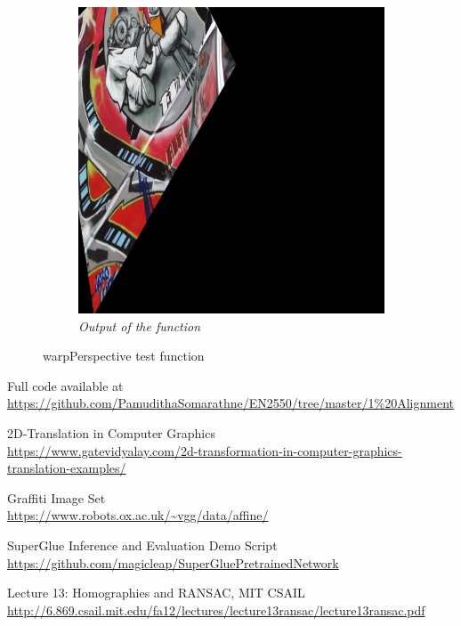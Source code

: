 \documentclass[11pt, a4paper]{article}
\begin{document}
\begin{figure}[H]
\begin{subfigure}[b]{0.32\textwidth}
		\centering
		\includegraphics[width=\textwidth]{./images/Bim1Warp.jpg}
		\caption{{\small \textit{Output of the function}}}
		\label{fig:h3}
	\end{subfigure}
	\hfill
	\caption{warpPerspective test function}
\end{figure}

Full code available at \url{https://github.com/PamudithaSomarathne/EN2550/tree/master/1\%20Alignment}

\begin{thebibliography}{AA}
2D-Translation in Computer Graphics\\
\url{https://www.gatevidyalay.com/2d-transformation-in-computer-graphics-translation-examples/}

Graffiti Image Set\\
\url{https://www.robots.ox.ac.uk/~vgg/data/affine/}

SuperGlue Inference and Evaluation Demo Script\\
\url{https://github.com/magicleap/SuperGluePretrainedNetwork}

Lecture 13: Homographies and RANSAC, MIT CSAIL\\
\url{http://6.869.csail.mit.edu/fa12/lectures/lecture13ransac/lecture13ransac.pdf}

\nocite{T, VGG, SuperGlue, MITHomo}
\end{thebibliography}
\end{document}
